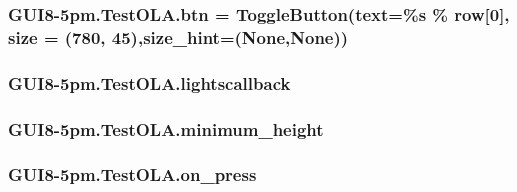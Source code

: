 \subsubsection[{\texorpdfstring{btn}{btn}}]{\setlength{\rightskip}{0pt plus 5cm}G\+U\+I8-\/5pm.\+Test\+O\+L\+A.\+btn = Toggle\+Button(text=\textquotesingle{}\%s\textquotesingle{} \% row\mbox{[}0\mbox{]}, size = (780, 45),size\+\_\+hint=(None,None))\hspace{0.3cm}{\ttfamily [static]}}\hypertarget{classGUI8-5pm_1_1TestOLA_ae461da919377be31d672675181dc3038}{}\label{classGUI8-5pm_1_1TestOLA_ae461da919377be31d672675181dc3038}
\subsubsection[{\texorpdfstring{lightscallback}{lightscallback}}]{\setlength{\rightskip}{0pt plus 5cm}G\+U\+I8-\/5pm.\+Test\+O\+L\+A.\+lightscallback\hspace{0.3cm}{\ttfamily [static]}}\hypertarget{classGUI8-5pm_1_1TestOLA_a919dc67fef3546484d7ac898b1b25a0b}{}\label{classGUI8-5pm_1_1TestOLA_a919dc67fef3546484d7ac898b1b25a0b}
\subsubsection[{\texorpdfstring{minimum\+\_\+height}{minimum_height}}]{\setlength{\rightskip}{0pt plus 5cm}G\+U\+I8-\/5pm.\+Test\+O\+L\+A.\+minimum\+\_\+height\hspace{0.3cm}{\ttfamily [static]}}\hypertarget{classGUI8-5pm_1_1TestOLA_ac0afaef201c71f917612c937163d35db}{}\label{classGUI8-5pm_1_1TestOLA_ac0afaef201c71f917612c937163d35db}
\subsubsection[{\texorpdfstring{on\+\_\+press}{on_press}}]{\setlength{\rightskip}{0pt plus 5cm}G\+U\+I8-\/5pm.\+Test\+O\+L\+A.\+on\+\_\+press\hspace{0.3cm}{\ttfamily [static]}}\hypertarget{classGUI8-5pm_1_1TestOLA_a4db7f675fef819171dcc39e8cf7a0522}{}\label{classGUI8-5pm_1_1TestOLA_a4db7f675fef819171dcc39e8cf7a0522}
